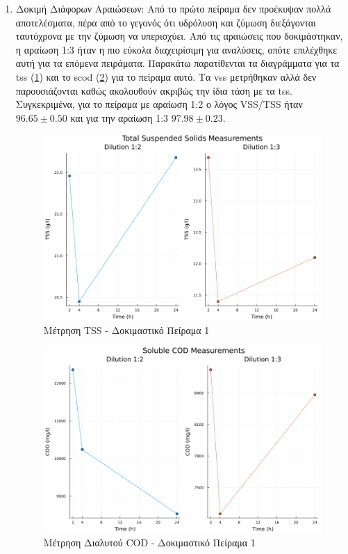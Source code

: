 \documentclass[11pt]{report}
\begin{document}
\begin{enumerate}
\item Δοκιμή Διάφορων Αραιώσεων:
\label{sec:org59ab483}
Από το πρώτο πείραμα δεν προέκυψαν πολλά αποτελέσματα, πέρα από το γεγονός ότι υδρόλυση και ζύμωση διεξάγονται ταυτόχρονα με την ζύμωση να υπερισχύει. Από τις αραιώσεις που δοκιμάστηκαν, η αραίωση 1:3 ήταν η πιο εύκολα διαχειρίσιμη για αναλύσεις, οπότε επιλέχθηκε αυτή για τα επόμενα πειράματα. Παρακάτω παρατίθενται τα διαγράμματα για τα \acrfull{tss} (\ref{fig:org83cccdd}) και το \acrfull{scod} (\ref{fig:orgfdcddfe}) για το πείραμα αυτό. Τα \acrfull{vss} μετρήθηκαν αλλά δεν παρουσιάζονται καθώς ακολουθούν ακριβώς την ίδια τάση με τα \acrfull{tss}. Συγκεκριμένα, για το πείραμα με αραίωση 1:2 ο λόγος VSS/TSS ήταν \(96.65 \pm 0.50\) και για την αραίωση 1:3 \(97.98 \pm 0.23\). 

\begin{figure}[htbp]
\centering
\includegraphics[width=.9\linewidth]{../plots/10_10/tss_plot.png}
\caption{\label{fig:org83cccdd}Μέτρηση TSS - Δοκιμαστικό Πείραμα 1}
\end{figure}

\begin{figure}[htbp]
\centering
\includegraphics[width=.9\linewidth]{../plots/10_10/COD_plot.png}
\caption{\label{fig:orgfdcddfe}Μέτρηση Διαλυτού COD - Δοκιμαστικό Πείραμα 1}
\end{figure}


\end{enumerate}
\end{document}
